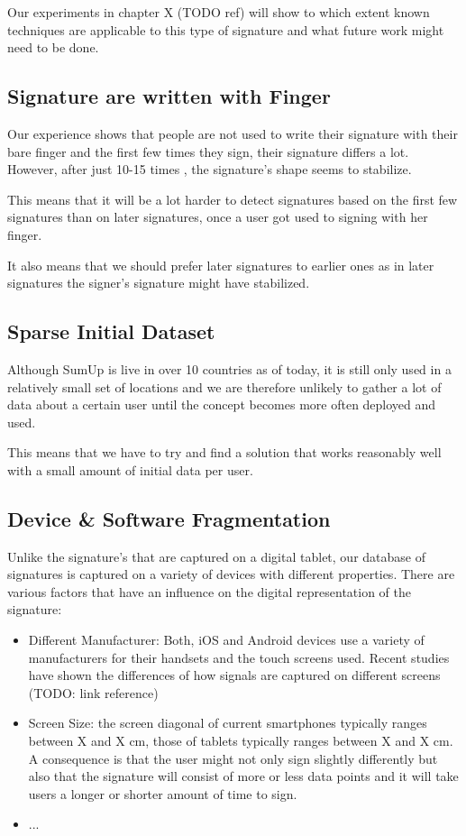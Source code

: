 \documentclass[a4paper, oneside]{csthesis}
\begin{document}
Our experiments in chapter X (TODO ref) will show to which extent known techniques are applicable to this type of signature and what future work might need to be done.

\subsection{Signature are written with Finger}

Our experience shows that people are not used to write their signature with their bare finger and the first few times they sign, their signature differs a lot. However, after just 10-15 times , the signature's shape seems to stabilize.

This means that it will be a lot harder to detect signatures based on the first few signatures than on later signatures, once a user got used to signing with her finger.

It also means that we should prefer later signatures to earlier ones as in later signatures the signer's signature might have stabilized.


\subsection{Sparse Initial Dataset}

Although SumUp is live in over 10 countries as of today, it is still only used in a relatively small set of locations and we are therefore unlikely to gather a lot of data about a certain user until the concept becomes more often deployed and used.

This means that we have to try and find a solution that works reasonably well with a small amount of initial data per user.


\subsection{Device \& Software Fragmentation}

Unlike the signature's that are captured on a digital tablet, our database of signatures is captured on a variety of devices with different properties. There are various factors that have an influence on the digital representation of the signature:

\begin{itemize}
\item Different Manufacturer: Both, iOS and Android devices use a variety of manufacturers for their handsets and the touch screens used. Recent studies have shown the differences of how signals are captured on different screens (TODO: link reference)
\item Screen Size: the screen diagonal of current smartphones typically ranges between X and X cm, those of tablets typically ranges between X and X cm. A consequence is that the user might not only sign slightly differently but also that the signature will consist of more or less data points and it will take users a longer or shorter amount of time to sign.
\item  ...
\end{itemize}
\end{document}
